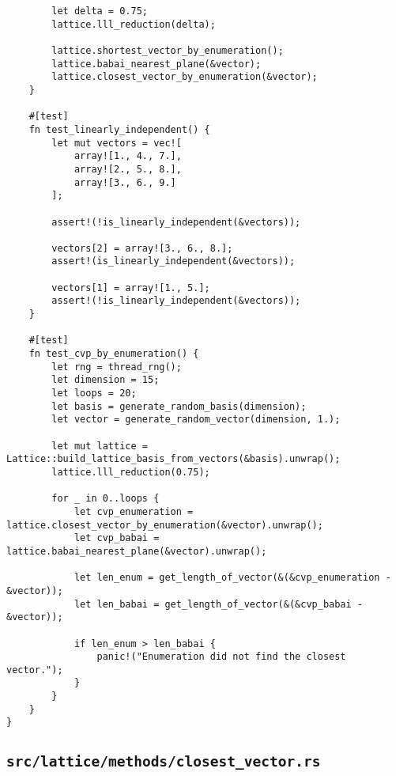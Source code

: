 \begin{verbatim}
        let delta = 0.75;
        lattice.lll_reduction(delta);

        lattice.shortest_vector_by_enumeration();
        lattice.babai_nearest_plane(&vector);
        lattice.closest_vector_by_enumeration(&vector);
    }

    #[test]
    fn test_linearly_independent() {
        let mut vectors = vec![
            array![1., 4., 7.],
            array![2., 5., 8.],
            array![3., 6., 9.]
        ];

        assert!(!is_linearly_independent(&vectors));

        vectors[2] = array![3., 6., 8.];
        assert!(is_linearly_independent(&vectors));

        vectors[1] = array![1., 5.];
        assert!(!is_linearly_independent(&vectors));
    }

    #[test]
    fn test_cvp_by_enumeration() {
        let rng = thread_rng();
        let dimension = 15;
        let loops = 20;
        let basis = generate_random_basis(dimension);
        let vector = generate_random_vector(dimension, 1.);

        let mut lattice = Lattice::build_lattice_basis_from_vectors(&basis).unwrap();
        lattice.lll_reduction(0.75);

        for _ in 0..loops {
            let cvp_enumeration = lattice.closest_vector_by_enumeration(&vector).unwrap();
            let cvp_babai = lattice.babai_nearest_plane(&vector).unwrap();

            let len_enum = get_length_of_vector(&(&cvp_enumeration - &vector));
            let len_babai = get_length_of_vector(&(&cvp_babai - &vector));

            if len_enum > len_babai {
                panic!("Enumeration did not find the closest vector.");
            }
        }
    }
}
\end{verbatim}


\subsection{\texttt{src/lattice/methods/closest_vector.rs}}

